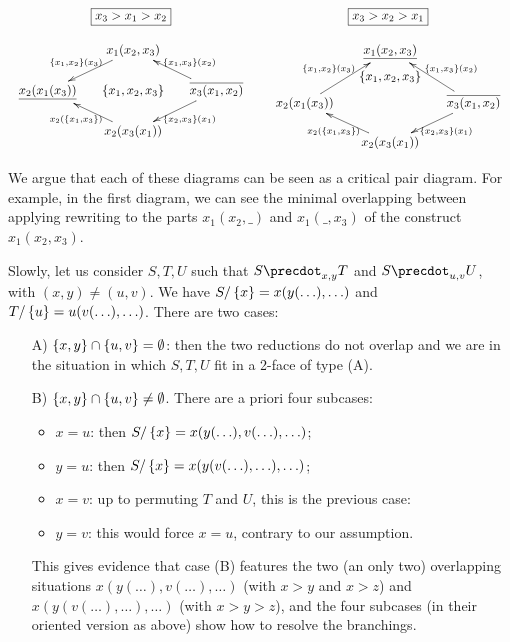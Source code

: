 $$\begin{array}{ccc}
\boxed{x_3>x_1>x_2} && \boxed{x_3>x_2>x_1}\\
&&\\
\xymatrix @-1.65pc {&& x_1(x_2,x_3) \ar @{->}[ddll]_{\set{x_1,x_2}(x_3)} \ar @{<-}[ddrr]^{\set{x_1,x_3}(x_2)}&& \\
&&&&\\
\underline{x_2(x_1(x_3))} \ar @{<-}[ddrr]_{x_2(\set{x_1,x_3})}&& \set{x_1,x_2,x_3}  && \overline{x_3(x_1,x_2)}\ar @{->}[ddll]^{\set{x_2,x_3}(x_1)}\\
&&&&\\
&&  x_2(x_3(x_1))&&}
&&


\xymatrix @-1.65pc {&& \underline{x_1(x_2,x_3)} \ar @{<-}[ddll]_{\set{x_1,x_2}(x_3)} \ar @{<-}[ddrr]^{\set{x_1,x_3}(x_2)}&& \\
&&\set{x_1,x_2,x_3}&&\\
x_2(x_1(x_3)) \ar @{<-}[ddrr]_{x_2(\set{x_1,x_3})}&&   && \overline{x_3(x_1,x_2)}\ar @{->}[ddll]^{\set{x_2,x_3}(x_1)}\\
&&&&\\
&&  x_2(x_3(x_1))&&}
  \end{array}
$$

We argue that each of these diagrams can be seen as a critical pair diagram. 
For example, in the first diagram, we can see the minimal overlapping between applying rewriting to the parts
$x_1(x_2,\_)$ and $x_1(\_,x_3)$ of the construct $x_1(x_2,x_3)$. 

Slowly, let us consider  $S,T,U$ such that $S\precdot_{x,y} T$ and $S\precdot_{u,v} U$, with  $(x,y)\neq(u,v)$.
We have
$S/\left\{x\right\}=x(y(\ldots),\ldots)$ and $T/\left\{u\right\}=u(v(\ldots),\ldots)$. There are two cases:
\begin{itemize}
\item[A)] $\left\{x,y\right\}\cap\left\{u,v\right\}=\emptyset$: then the two reductions do not overlap and we are in the situation in which $S,T,U$ fit in a 2-face of type (A).
\item[B)] $\left\{x,y\right\}\cap\left\{u,v\right\}\neq\emptyset$. There are a priori four subcases:
\begin{itemize}
\item $x=u$: then $S/\left\{x\right\}=x(y(\ldots),v(\ldots),\ldots)$;
\item $y=u$: then  $S/\left\{x\right\}=x(y(v(\ldots),\ldots),\ldots)$;
\item $x=v$: up to permuting $T$ and $U$, this is the previous case:
\item $y=v$: this would force $x=u$, contrary to our assumption.
\end{itemize}
This gives evidence that case (B) features the two (an only two) overlapping situations $x(y(\ldots),v(\ldots),\ldots)$ (with $x>y$ and $x>z$) and 
$x(y(v(\ldots),\ldots),\ldots)$ (with $x>y>z$), and the four subcases  (in their oriented version as above) show how to resolve the branchings.
\end{itemize}

